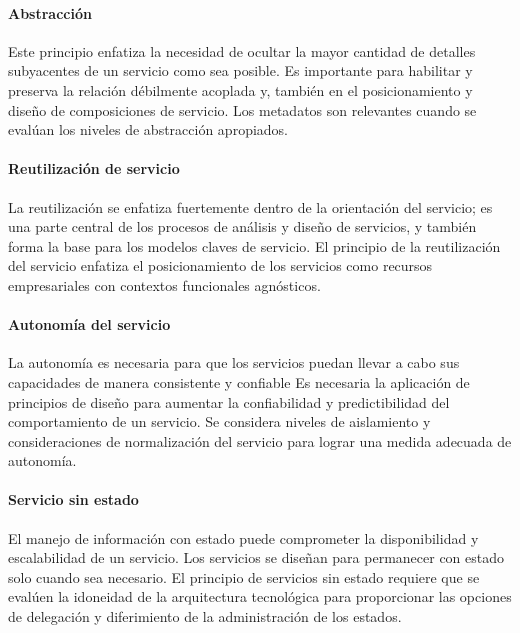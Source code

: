  	\paragraph{Abstracción}
 	  
 	 Este principio enfatiza la necesidad de ocultar la mayor cantidad de detalles subyacentes de un servicio como sea posible. 
 	Es importante para habilitar y preserva la relación débilmente acoplada y, también en el posicionamiento y diseño de composiciones de servicio.
 	 Los metadatos son relevantes cuando se evalúan los niveles de abstracción apropiados.   
 	
 		
 	\paragraph{Reutilización de servicio}
 	  La reutilización se enfatiza fuertemente dentro de la orientación del servicio; es una parte central de los  procesos de análisis y diseño de servicios, y también forma la base para los modelos claves de servicio.
 	 El principio de la reutilización del servicio enfatiza el posicionamiento de los servicios como recursos empresariales con contextos funcionales agnósticos.   
 	 
 	 
 	 \paragraph{Autonomía del servicio}
 	  
 	  La autonomía es necesaria para que los servicios puedan llevar a cabo sus capacidades de manera consistente y confiable
 	 Es necesaria la aplicación de principios de diseño para aumentar la confiabilidad y predictibilidad del comportamiento de un servicio.   
 	 Se considera niveles de aislamiento y consideraciones de normalización del servicio para lograr una medida adecuada de autonomía.  
 	  
 	 	
 	 \paragraph{Servicio sin estado}
 	  	 
 	 	El manejo de información con estado  puede comprometer la disponibilidad y escalabilidad de un servicio. Los servicios se diseñan para permanecer con estado solo cuando sea necesario. 
 	 	El principio de servicios \gls{sin estado} requiere que se evalúen la idoneidad de la arquitectura tecnológica para proporcionar las opciones de delegación y diferimiento de la administración de los estados.  
 	  
